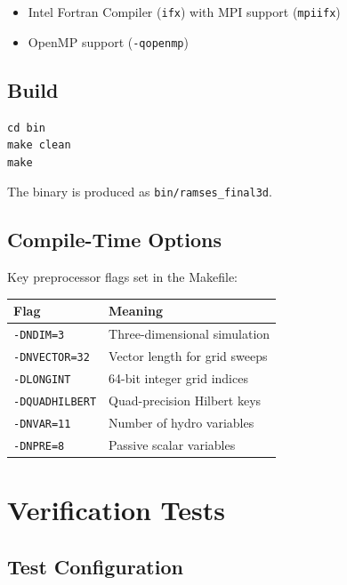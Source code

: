 \documentclass[11pt,fleqn]{book}
\begin{document}
\begin{itemize}[leftmargin=2em]
  \item Intel Fortran Compiler (\texttt{ifx}) with MPI support (\texttt{mpiifx})
  \item OpenMP support (\texttt{-qopenmp})
\end{itemize}

\section{Build}

\begin{codebox}
\begin{lstlisting}[style=bash,numbers=none]
cd bin
make clean
make
\end{lstlisting}
\end{codebox}

The binary is produced as \texttt{bin/ramses\_final3d}.

\section{Compile-Time Options}

Key preprocessor flags set in the Makefile:
\begin{center}
\begin{tabular}{ll}
\toprule
\textbf{Flag} & \textbf{Meaning} \\
\midrule
\texttt{-DNDIM=3} & Three-dimensional simulation \\
\texttt{-DNVECTOR=32} & Vector length for grid sweeps \\
\texttt{-DLONGINT} & 64-bit integer grid indices \\
\texttt{-DQUADHILBERT} & Quad-precision Hilbert keys \\
\texttt{-DNVAR=11} & Number of hydro variables \\
\texttt{-DNPRE=8} & Passive scalar variables \\
\bottomrule
\end{tabular}
\end{center}


\chapter{Verification Tests}

\section{Test Configuration}
\end{document}
